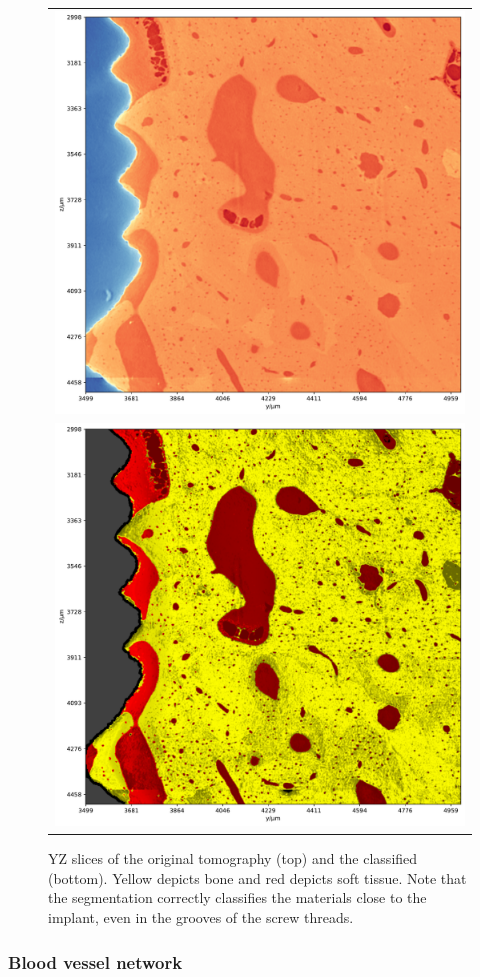 \begin{figure}
    \centering
    \begin{tabular}{c}
        \includegraphics[width=.7\linewidth]{generated/770c_pag_segmented_zy_raw.pdf} \\
        \includegraphics[width=.7\linewidth]{generated/770c_pag_segmented_zy_colored.pdf}
    \end{tabular}
    \caption{
        YZ slices of the original tomography (top) and the classified (bottom).
        Yellow depicts bone and red depicts soft tissue. Note that the
        segmentation correctly classifies the materials close to the implant,
        even in the grooves of the screw threads.
    }
    \label{fig:histology-comparison2}
\end{figure}

\subsubsection{Blood vessel network}

